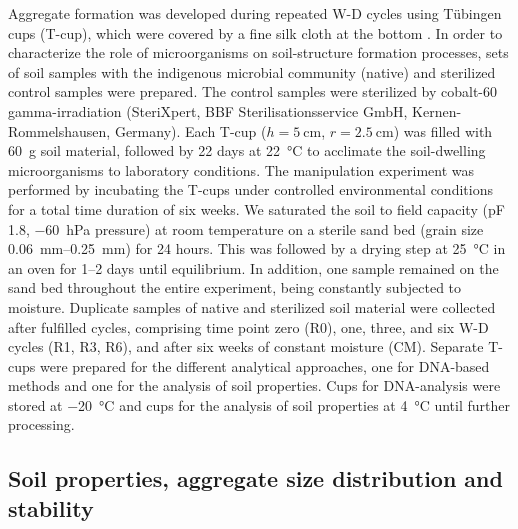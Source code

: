 Aggregate formation was developed during repeated W-D cycles using T{\"u}bingen cups (T-cup), which were covered by a fine silk cloth at the bottom \citep{Scholten2011}. 
In order to characterize the role of microorganisms on soil-structure formation processes, sets of soil samples with the indigenous microbial community (native) and sterilized control samples were prepared. 
The control samples were sterilized by cobalt-60 gamma-irradiation (SteriXpert, BBF Sterilisationsservice GmbH, Kernen-Rommelshausen, Germany). 
Each T-cup (\(h = \SI{5}{\centi\metre}\), \(r = \SI{2.5}{\centi\metre}\)) was filled with \SI{60}{\gram} soil material, followed by 22 days at \SI{22}{\degreeCelsius} to acclimate the soil-dwelling microorganisms to laboratory conditions. 
The manipulation experiment was performed by incubating the T-cups under controlled environmental conditions for a total time duration of six weeks. 
We saturated the soil to field capacity (pF 1.8, \SI{-60}{\hecto\pascal} pressure) at room temperature on a sterile sand bed (grain size \SIrange{0.06}{0.25}{\milli\metre}) for 24 hours. 
This was followed by a drying step at \SI{25}{\degreeCelsius} in an oven for 1--2 days until equilibrium. 
In addition, one sample remained on the sand bed throughout the entire experiment, being constantly subjected to moisture. 
Duplicate samples of native and sterilized soil material were collected after fulfilled cycles, comprising time point zero (R0), one, three, and six W-D cycles (R1, R3, R6), and after six weeks of constant moisture (CM). 
Separate T-cups were prepared for the different analytical approaches, one for DNA-based methods and one for the analysis of soil properties. 
Cups for DNA-analysis were stored at \SI{-20}{\degreeCelsius} and cups for the analysis of soil properties at \SI{4}{\degreeCelsius} until further processing.

\subsection{Soil properties, aggregate size distribution and stability}

